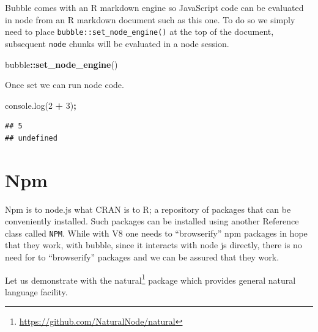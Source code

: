 \documentclass[
]{krantz}
\makeatletter
\newenvironment{Shaded}{\begin{snugshade}}{\end{snugshade}}
\newcommand{\AttributeTok}[1]{\textcolor[rgb]{0.61,0.61,0.61}{#1}}
\newcommand{\CommentTok}[1]{\textcolor[rgb]{0.37,0.37,0.37}{\textit{#1}}}
\newcommand{\DecValTok}[1]{\textcolor[rgb]{0.06,0.06,0.06}{#1}}
\newcommand{\KeywordTok}[1]{\textcolor[rgb]{0.27,0.27,0.27}{\textbf{#1}}}
\newcommand{\NormalTok}[1]{#1}
\newcommand{\OperatorTok}[1]{\textcolor[rgb]{0.43,0.43,0.43}{\textbf{#1}}}
\newcommand{\StringTok}[1]{\textcolor[rgb]{0.5,0.5,0.5}{#1}}
\newcommand{\VariableTok}[1]{\textcolor[rgb]{0,0,0}{#1}}
\renewcommand{\href}[2]{#2\footnote{\url{#1}}}
\newenvironment{kframe}{%
\medskip{}
\setlength{\fboxsep}{.8em}
 \def\at@end@of@kframe{}%
 \ifinner\ifhmode%
  \def\at@end@of@kframe{\end{minipage}}%
  \begin{minipage}{\columnwidth}%
 \fi\fi%
 \def\FrameCommand##1{\hskip\@totalleftmargin \hskip-\fboxsep
 \colorbox{shadecolor}{##1}\hskip-\fboxsep
     \hskip-\linewidth \hskip-\@totalleftmargin \hskip\columnwidth}%
 \MakeFramed {\advance\hsize-\width
   \@totalleftmargin\z@ \linewidth\hsize
   \@setminipage}}%
 {\par\unskip\endMakeFramed%
 \at@end@of@kframe}
\renewenvironment{Shaded}{\begin{kframe}}{\end{kframe}}
\makeatother
\begin{document}
Bubble comes with an R markdown engine so JavaScript code can be evaluated in node from an R markdown document such as this one. To do so we simply need to place \texttt{bubble::set\_node\_engine()} at the top of the document, subsequent \texttt{node} chunks will be evaluated in a node session.

\begin{Shaded}
\begin{Highlighting}[]
\NormalTok{bubble}\OperatorTok{::}\KeywordTok{set\_node\_engine}\NormalTok{()}
\end{Highlighting}
\end{Shaded}

Once set we can run node code.

\begin{Shaded}
\begin{Highlighting}[]
\VariableTok{console}\NormalTok{.}\AttributeTok{log}\NormalTok{(}\DecValTok{2} \OperatorTok{+} \DecValTok{3}\NormalTok{)}\OperatorTok{;}
\end{Highlighting}
\end{Shaded}

\begin{verbatim}
## 5
## undefined
\end{verbatim}

\hypertarget{npm}{%
\section{Npm}\label{npm}}

Npm is to node.js what CRAN is to R; a repository of packages that can be conveniently installed. Such packages can be installed using another Reference class called \texttt{NPM}. While with V8 one needs to ``browserify'' npm packages in hope that they work, with bubble, since it interacts with node js directly, there is no need for to ``browserify'' packages and we can be assured that they work.

Let us demonstrate with the \href{https://github.com/NaturalNode/natural}{natural} package which provides general natural language facility.

\begin{Shaded}
\end{Shaded}
\end{document}
